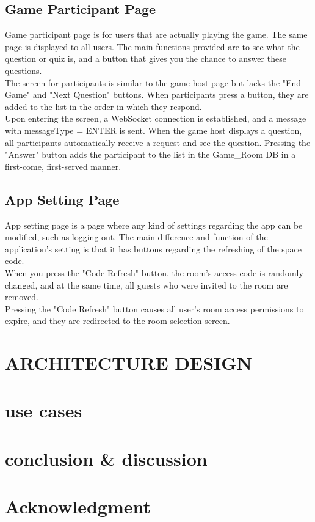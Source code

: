 \documentclass[conference]{IEEEtran}
\begin{document}
    \subsection{Game Participant Page}
        Game participant page is for users that are actually playing the game. The same page is displayed to all users. The main functions provided are to see what the question or quiz is, and a button that gives you the chance to answer these questions. \\
        The screen for participants is similar to the game host page but lacks the "End Game" and "Next Question" buttons. When participants press a button, they are added to the list in the order in which they respond. \\
    	Upon entering the screen, a WebSocket connection is established, and a message with messageType = ENTER is sent. When the game host displays a question, all participants automatically receive a request and see the question. Pressing the "Answer" button adds the participant to the list in the Game\_Room DB in a first-come, first-served manner.

    \subsection{App Setting Page}
        App setting page is a page where any kind of settings regarding the app can be modified, such as logging out. The main difference and function of the application’s setting is that it has buttons regarding the refreshing of the space code.\\
        When you press the "Code Refresh" button, the room's access code is randomly changed, and at the same time, all guests who were invited to the room are removed.\\
        Pressing the "Code Refresh" button causes all user's room access permissions to expire, and they are redirected to the room selection screen.

\section{ARCHITECTURE DESIGN}

\section{use cases}

\section{conclusion \& discussion}

\section*{Acknowledgment}
\end{document}

